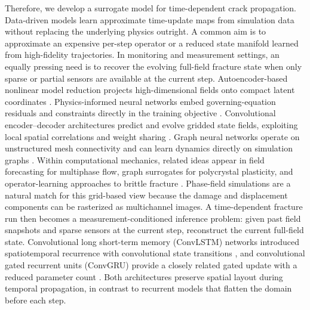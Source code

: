 \documentclass[10pt]{article}
\theoremstyle{definition}
\begin{document}
Therefore, we develop a surrogate model for time-dependent crack propagation.
%
Data-driven models learn approximate time-update maps from simulation data without replacing the underlying physics outright.
%
A common aim is to approximate an expensive per-step operator or a reduced state manifold learned from high-fidelity trajectories.
%
In monitoring and measurement settings, an equally pressing need is to recover the evolving full-field fracture state when only sparse or partial sensors are available at the current step.
%
Autoencoder-based nonlinear model reduction projects high-dimensional fields onto compact latent coordinates \cite{lee2020}.
%
Physics-informed neural networks embed governing-equation residuals and constraints directly in the training objective \cite{raissi2019, zhai2022predicting}.
%
Convolutional encoder--decoder architectures predict and evolve gridded state fields, exploiting local spatial correlations and weight sharing \cite{geneva2020,lecun1998}.
%
Graph neural networks operate on unstructured mesh connectivity and can learn dynamics directly on simulation graphs \cite{pfaff2021, zhai2025}.
%
Within computational mechanics, related ideas appear in field forecasting for multiphase flow, graph surrogates for polycrystal plasticity, and operator-learning approaches to brittle fracture \cite{wen2021,zhai2025,goswami2022}.
%
Phase-field simulations are a natural match for this grid-based view because the damage and displacement components can be rasterized as multichannel images.
%
A time-dependent fracture run then becomes a measurement-conditioned inference problem: given past field snapshots and sparse sensors at the current step, reconstruct the current full-field state.
%
Convolutional long short-term memory (ConvLSTM) networks introduced spatiotemporal recurrence with convolutional state transitions \cite{shi2015}, and convolutional gated recurrent units (ConvGRU) provide a closely related gated update with a reduced parameter count \cite{ballas2016}.
%
Both architectures preserve spatial layout during temporal propagation, in contrast to recurrent models that flatten the domain before each step.
\end{document}

